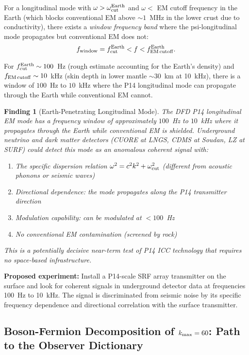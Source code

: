 \documentclass[11pt]{article}
\newtheorem{finding}{Finding}[section]
\theoremstyle{definition}
\theoremstyle{remark}
\begin{document}
For a longitudinal mode with $\omega > \omega_{\rm cut}^{\rm Earth}$
and $\omega <$ EM cutoff frequency in the Earth (which blocks conventional
EM above $\sim 1$~MHz in the lower crust due to conductivity), there
exists a \emph{window frequency band} where the psi-longitudinal mode
propagates but conventional EM does not:
\begin{equation}
f_{\rm window} = f_{\rm cut}^{\rm Earth} < f < f_{\rm EM\,cutoff}^{\rm Earth}.
\end{equation}

For $f_{\rm cut}^{\rm Earth} \sim 100$~Hz (rough estimate accounting
for the Earth's density) and $f_{\rm EM\,cutoff} \sim 10$~kHz (skin
depth in lower mantle $\sim 30$~km at 10~kHz), there is a window of
$100$~Hz to $10$~kHz where the P14 longitudinal mode can propagate
through the Earth while conventional EM cannot.

\begin{finding}[Earth-Penetrating Longitudinal Mode]
\label{find:earth}
The DFD P14 longitudinal EM mode has a frequency window of approximately
$100$~Hz to $10$~kHz where it propagates through the Earth while
conventional EM is shielded. Underground neutrino and dark matter
detectors (CUORE at LNGS, CDMS at Soudan, LZ at SURF) could detect
this mode as an anomalous coherent signal with:
\begin{enumerate}
\item The specific dispersion relation $\omega^2 = c^2k^2 + \omega_{\rm cut}^2$
  (different from acoustic phonons or seismic waves)
\item Directional dependence: the mode propagates along the P14 transmitter
  direction
\item Modulation capability: can be modulated at $< 100$~Hz
\item No conventional EM contamination (screened by rock)
\end{enumerate}
This is a potentially decisive near-term test of P14 ICC technology
that requires no space-based infrastructure.
\end{finding}

\textbf{Proposed experiment:} Install a P14-scale SRF array transmitter
on the surface and look for coherent signals in underground detector
data at frequencies 100~Hz to 10~kHz. The signal is discriminated from
seismic noise by its specific frequency dependence and directional
correlation with the surface transmitter.

\subsection{Boson-Fermion Decomposition of $k_{\rm max} = 60$: Path to the Observer Dictionary}
\end{document}
